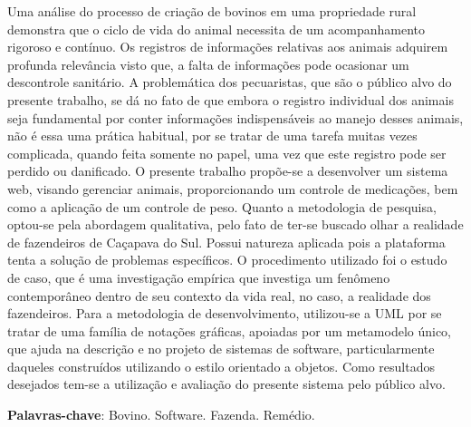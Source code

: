 %
%

\begin{RESUMO}
\thispagestyle{empty}
	\begin{SingleSpace}
	
		\hspace{-1.2 cm}  Uma análise do processo de criação de bovinos em uma propriedade rural demonstra que o ciclo de vida do animal necessita de um acompanhamento rigoroso e contínuo. Os registros de informações relativas aos animais adquirem profunda relevância visto que, a falta de informações pode ocasionar um descontrole sanitário. A problemática dos pecuaristas, que são o público alvo do presente trabalho, se dá no fato de que embora o registro individual dos animais seja fundamental por conter informações indispensáveis ao manejo desses animais, não é essa uma prática habitual, por se tratar de uma tarefa muitas vezes complicada, quando feita somente no papel, uma vez que este registro pode ser perdido ou danificado. O presente trabalho propõe-se a desenvolver um sistema web, visando gerenciar animais, proporcionando um controle de medicações, bem como a aplicação de um controle de peso. Quanto a metodologia de pesquisa, optou-se pela abordagem qualitativa, pelo fato de ter-se buscado olhar a realidade de fazendeiros de Caçapava do Sul. Possui natureza aplicada pois a plataforma tenta a solução de problemas específicos. O procedimento utilizado foi o estudo de caso, que é uma investigação empírica que investiga um fenômeno contemporâneo dentro de seu contexto da vida real, no caso, a realidade dos fazendeiros. Para a metodologia de desenvolvimento, utilizou-se a UML por se tratar de uma família de notações gráficas, apoiadas por um metamodelo único, que ajuda na descrição e no projeto de sistemas de software, particularmente daqueles construídos utilizando o estilo orientado a objetos. Como resultados desejados tem-se a utilização e avaliação do presente sistema pelo público alvo.

		\vspace*{0.5cm}\hspace{-1.3 cm}\textbf{Palavras-chave}: Bovino. Software. Fazenda. Remédio.
		
		
		
	\end{SingleSpace}
\end{RESUMO}


